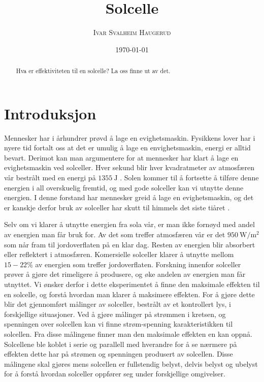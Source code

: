 \documentclass[%
 reprint,
 amsmath,amssymb,
 aps,
 norsk,
 booktabs
]{revtex4-1}
\begin{document}
\title{Solcelle}
\author{\textsc{Ivar Svalheim Haugerud}}
\date{\today}

\begin{abstract}
Hva er effektiviteten til en solcelle? La oss finne ut av det.
\end{abstract}

\maketitle

\section{Introduksjon}
Mennesker har i århundrer prøvd å lage en evighetsmaskin. Fysikkens lover har i nyere tid fortalt oss at det er umulig å lage en envighetsmaskin, energi er alltid bevart. Derimot kan man argumentere for at mennesker har klart å lage en evighetsmaskin ved solceller. Hver sekund blir hver kvadratmeter av atmosfæren vår bestrålt med en energi på $\SI{1355}{\joule}$ \cite{oppgave}. Solen kommer til å fortsette å tilføre denne energien i all overskuelig fremtid, og med gode solceller kan vi utnytte denne energien. I denne forstand har mennesker greid å lage en evighetsmaskin, og det er kanskje derfor bruk av solceller har skutt til himmels det siste tiåret \cite{oppgave}.\par
Selv om vi klarer å utnytte energien fra sola vår, er man ikke fornøyd med andel av energien man får bruk for. Av det som treffer atmosfæren vår er det $\SI{950}{\watt\per\meter^2}$ som når fram til jordoverflaten på en klar dag. Resten av energien blir absorbert eller reflektert i atmosfæren. Komersielle solceller klarer å utnytte mellom $15-22\%$ av energien som treffer jordoverflaten. Forskning innenfor solceller prøver å gjøre det rimeligere å produsere, og øke andelen av energien man får utnyttet. Vi ønsker derfor i dette eksperimentet å finne den maksimale effekten til en solcelle, og forstå hvordan man klarer å maksimere effekten. For å gjøre dette blir det gjennomført målinger av solceller, bestrålt av et kontrollert lys, i forskjellige situasjoner. Ved å gjøre målinger på strømmen i kretsen, og spenningen over solcellen kan vi finne strøm-spenning karakteristikken til solcellen. Fra disse målingene finner man den maksimale effekten en kan oppnå. Solcellene ble koblet i serie og parallell med hverandre for å se nærmere på effekten dette har på strømen og spenningen produsert av solcellen. Disse målingene skal gjøres mens solcellen er fullstendig belyst, delvis belyst og ubelyst for å forstå hvordan solceller oppfører seg under forskjellige omgivelser.
\end{document}
